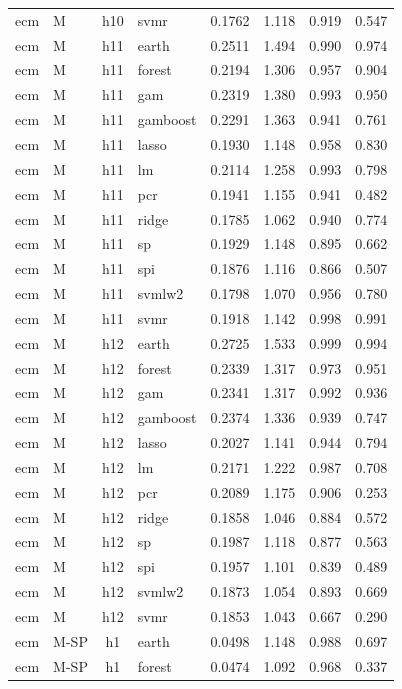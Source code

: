 \begin{ThreePartTable}
\begin{longtable}[t]{llclcccc}
ecm & M & h10 & svmr & 0.1762 & 1.118 & 0.919 & 0.547\\
\addlinespace
ecm & M & h11 & earth & 0.2511 & 1.494 & 0.990 & 0.974\\
ecm & M & h11 & forest & 0.2194 & 1.306 & 0.957 & 0.904\\
ecm & M & h11 & gam & 0.2319 & 1.380 & 0.993 & 0.950\\
ecm & M & h11 & gamboost & 0.2291 & 1.363 & 0.941 & 0.761\\
ecm & M & h11 & lasso & 0.1930 & 1.148 & 0.958 & 0.830\\
ecm & M & h11 & lm & 0.2114 & 1.258 & 0.993 & 0.798\\
ecm & M & h11 & pcr & 0.1941 & 1.155 & 0.941 & 0.482\\
ecm & M & h11 & ridge & 0.1785 & 1.062 & 0.940 & 0.774\\
ecm & M & h11 & sp & 0.1929 & 1.148 & 0.895 & 0.662\\
ecm & M & h11 & spi & 0.1876 & 1.116 & 0.866 & 0.507\\
ecm & M & h11 & svmlw2 & 0.1798 & 1.070 & 0.956 & 0.780\\
ecm & M & h11 & svmr & 0.1918 & 1.142 & 0.998 & 0.991\\
\addlinespace
ecm & M & h12 & earth & 0.2725 & 1.533 & 0.999 & 0.994\\
ecm & M & h12 & forest & 0.2339 & 1.317 & 0.973 & 0.951\\
ecm & M & h12 & gam & 0.2341 & 1.317 & 0.992 & 0.936\\
ecm & M & h12 & gamboost & 0.2374 & 1.336 & 0.939 & 0.747\\
ecm & M & h12 & lasso & 0.2027 & 1.141 & 0.944 & 0.794\\
ecm & M & h12 & lm & 0.2171 & 1.222 & 0.987 & 0.708\\
ecm & M & h12 & pcr & 0.2089 & 1.175 & 0.906 & 0.253\\
ecm & M & h12 & ridge & 0.1858 & 1.046 & 0.884 & 0.572\\
ecm & M & h12 & sp & 0.1987 & 1.118 & 0.877 & 0.563\\
ecm & M & h12 & spi & 0.1957 & 1.101 & 0.839 & 0.489\\
ecm & M & h12 & svmlw2 & 0.1873 & 1.054 & 0.893 & 0.669\\
ecm & M & h12 & svmr & 0.1853 & 1.043 & 0.667 & 0.290\\
\addlinespace
ecm & M-SP & h1 & earth & 0.0498 & 1.148 & 0.988 & 0.697\\
ecm & M-SP & h1 & forest & 0.0474 & 1.092 & 0.968 & 0.337\\

\end{longtable}
\end{ThreePartTable}
